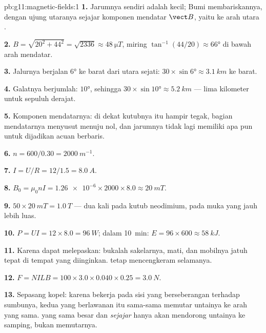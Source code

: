 \begin{solution}{pb:g11:magnetic-fields:1}
\textbf{1.} Jarumnya sendiri adalah  kecil;  Bumi
membariskannya, dengan ujung utaranya sejajar komponen mendatar
$\vect B$, yaitu ke arah utara .

\textbf{2.} $B = \sqrt{20^2 + 44^2} = \sqrt{2336} \approx
\qty{48}{\micro T}$, miring $\tan^{-1}(44/20) \approx \ang{66}$ di
bawah arah mendatar.

\textbf{3.} Jalurnya berjalan $\ang{6}$ ke barat dari utara sejati:
$30 \times \sin\ang{6} \approx \qty{3.1}{km}$ ke barat.

\textbf{4.} Galatnya berjumlah: $\ang{10}$, sehingga
$30 \times \sin\ang{10} \approx
\qty{5.2}{km}$ --- lima kilometer untuk
sepuluh derajat.

\textbf{5.} Komponen mendatarnya: di dekat kutubnya  itu hampir
tegak, bagian mendatarnya menyusut menuju nol, dan jarumnya tidak lagi
memiliki apa pun untuk dijadikan acuan berbaris.

\textbf{6.} $n = 600/0.30 = \qty{2000}{m^{-1}}$.

\textbf{7.} $I = U/R = 12/1.5 = \qty{8.0}{A}$.

\textbf{8.} $B_0 = \mu_0 n I = \num{1.26e-6} \times 2000 \times 8.0
\approx \qty{20}{mT}$.

\textbf{9.} $50 \times \qty{20}{mT} = \qty{1.0}{T}$ --- dua kali 
pada kutub neodimium, pada muka yang jauh lebih luas.

\textbf{10.} $P = UI = 12 \times 8.0 = \qty{96}{W}$; dalam
\qty{10}{\minute}: $E = 96 \times 600 \approx \qty{58}{kJ}$.

\textbf{11.} Karena  dapat melepaskan: bukalah sakelarnya,
 mati, dan mobilnya jatuh tepat di tempat yang diinginkan.
 tetap mencengkeram selamanya.

\textbf{12.} $F = NILB = 100 \times 3.0 \times 0.040 \times 0.25 =
\qty{3.0}{N}$.

\textbf{13.} Sepasang kopel: karena bekerja pada sisi yang berseberangan
terhadap sumbunya, kedua  yang berlawanan itu sama-sama memutar
untainya ke arah yang sama.  yang sama besar dan \emph{sejajar}
hanya akan mendorong untainya ke samping, bukan memutarnya.


\end{solution}
